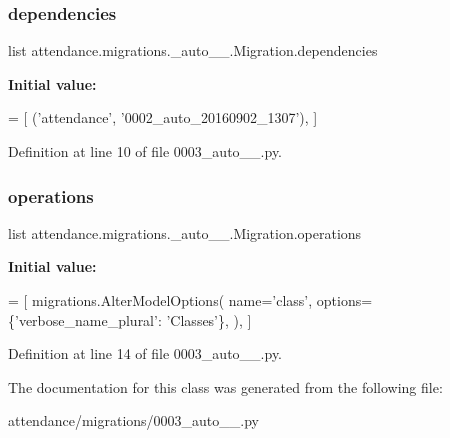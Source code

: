 \subsubsection{\texorpdfstring{dependencies}{dependencies}}
{\footnotesize\ttfamily list attendance.\+migrations.\+\_\+auto\+\_\+\_.\+Migration.\+dependencies\hspace{0.3cm}{\ttfamily [static]}}

{\bfseries Initial value\+:}
\begin{DoxyCode}
=  [
        (\textcolor{stringliteral}{'attendance'}, \textcolor{stringliteral}{'0002\_auto\_20160902\_1307'}),
    ]
\end{DoxyCode}


Definition at line 10 of file 0003\+\_\+auto\+\_\+\_.\+py.

\hypertarget{classattendance_1_1migrations_1_10003__auto__20160922__1447_1_1_migration_a5997635263b80a842d6c4ec4c8e9bd31}{}\label{classattendance_1_1migrations_1_10003__auto__20160922__1447_1_1_migration_a5997635263b80a842d6c4ec4c8e9bd31} 
\subsubsection{\texorpdfstring{operations}{operations}}
{\footnotesize\ttfamily list attendance.\+migrations.\+\_\+auto\+\_\+\_.\+Migration.\+operations\hspace{0.3cm}{\ttfamily [static]}}

{\bfseries Initial value\+:}
\begin{DoxyCode}
=  [
        migrations.AlterModelOptions(
            name=\textcolor{stringliteral}{'class'},
            options=\{\textcolor{stringliteral}{'verbose\_name\_plural'}: \textcolor{stringliteral}{'Classes'}\},
        ),
    ]
\end{DoxyCode}


Definition at line 14 of file 0003\+\_\+auto\+\_\+\_.\+py.



The documentation for this class was generated from the following file\+:\begin{DoxyCompactItemize}
\item 
attendance/migrations/0003\+\_\+auto\+\_\+\_.\+py\end{DoxyCompactItemize}
